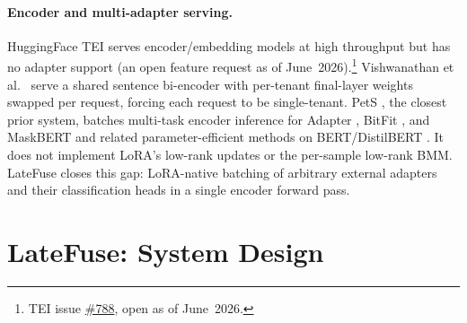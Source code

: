 \documentclass[11pt]{article}
\newcommand{\sysname}{LateFuse}
\begin{document}
\paragraph{Encoder and multi-adapter serving.}
HuggingFace TEI \cite{huggingface2023tei} serves encoder/embedding models at
high throughput but has no adapter support (an open feature request as of
June~2026).\footnote{TEI issue \href{https://github.com/huggingface/text-embeddings-inference/issues/788}{\#788}, open as of June~2026.}
Vishwanathan et al.~\cite{vishwanathan2022multitenant} serve a shared sentence
bi-encoder with per-tenant final-layer weights swapped per request, forcing
each request to be single-tenant. PetS \cite{zhou2022pets}, the closest prior
system, batches multi-task encoder inference for Adapter \cite{houlsby2019adapter},
BitFit \cite{benzaken2022bitfit}, and MaskBERT \cite{zhao2020masking} and related parameter-efficient
methods on BERT/DistilBERT \cite{sanh2020distilbertdistilledversionbert}. It does not implement LoRA's low-rank updates or
the per-sample low-rank BMM. \sysname{} closes this gap: LoRA-native
batching of arbitrary external adapters and their classification heads in a
single encoder forward pass.%
\section{\sysname: System Design}
\label{sec:system}
\end{document}
